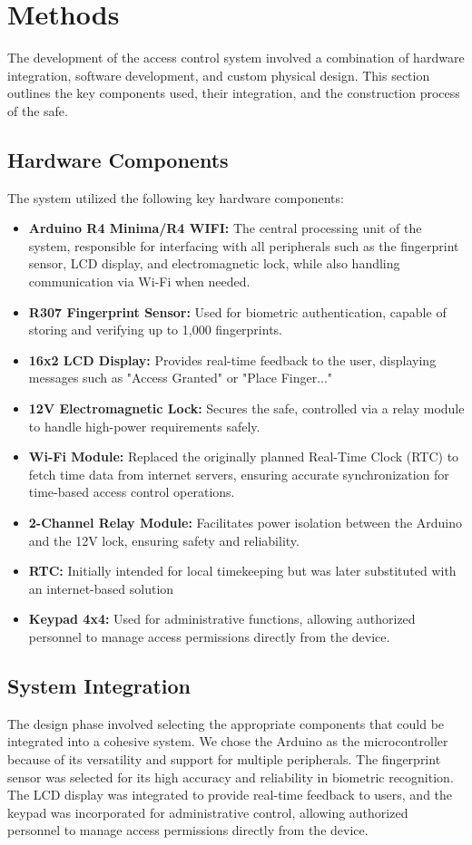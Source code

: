 \documentclass{article}
\begin{document}
    
\newpage
\section{Methods}
The development of the access control system involved a combination of hardware integration, software development, and custom physical design. This section outlines the key components used, their integration, and the construction process of the safe.

\subsection{Hardware Components}
The system utilized the following key hardware components:
\begin{itemize}
    \item \textbf{Arduino R4 Minima/R4 WIFI:} The central processing unit of the system, responsible for interfacing with all peripherals such as the fingerprint sensor, LCD display, and electromagnetic lock, while also handling communication via Wi-Fi when needed.
    \item \textbf{R307 Fingerprint Sensor:} Used for biometric authentication, capable of storing and verifying up to 1,000 fingerprints.
    \item \textbf{16x2 LCD Display:} Provides real-time feedback to the user, displaying messages such as "Access Granted" or "Place Finger..."
    \item \textbf{12V Electromagnetic Lock:} Secures the safe, controlled via a relay module to handle high-power requirements safely.
    \item \textbf{Wi-Fi Module:} Replaced the originally planned Real-Time Clock (RTC) to fetch time data from internet servers, ensuring accurate synchronization for time-based access control operations.
    \item \textbf{2-Channel Relay Module:} Facilitates power isolation between the Arduino and the 12V lock, ensuring safety and reliability.
    \item \textbf{RTC: } Initially intended for local timekeeping but was later substituted with an internet-based solution
    \item \textbf{Keypad 4x4:} Used for administrative functions, allowing authorized personnel to manage access permissions directly from the device.
\end{itemize}

\subsection{System Integration}
The design phase involved selecting the appropriate components that could be integrated into a cohesive system. We chose the Arduino as the microcontroller because of its versatility and support for multiple peripherals. The fingerprint sensor was selected for its high accuracy and reliability in biometric recognition. The LCD display was integrated to provide real-time feedback to users, and the keypad was incorporated for administrative control, allowing authorized personnel to manage access permissions directly from the device.
\end{document}

